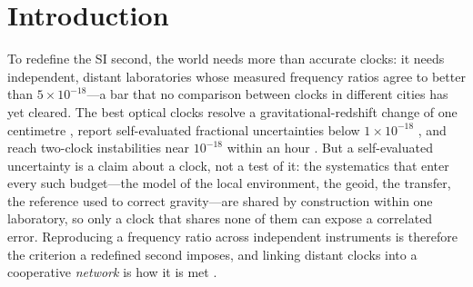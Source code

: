\documentclass[11pt,a4paper]{article}
\begin{document}
\begin{abstract}
\end{abstract}


\section{Introduction}
To redefine the SI second, the world needs more than accurate clocks: it
needs independent, distant laboratories whose measured frequency ratios
agree to better than $5\times10^{-18}$---a bar that no comparison between
clocks in different cities has yet cleared. The best optical clocks
resolve a gravitational-redshift change of one centimetre
\citep{mcgrew2018geodesy}, report self-evaluated fractional uncertainties
below $1\times10^{-18}$ \citep{arnold2026lu, zhang2026ca}, and reach
two-clock instabilities near $10^{-18}$ within an hour
\citep{oelker2019stability}. But a self-evaluated uncertainty is a claim
about a clock, not a test of it: the systematics that enter every such
budget---the model of the local environment, the geoid, the transfer,
the reference used to correct gravity---are shared by construction within
one laboratory, so only a clock that shares none of them can expose a
correlated error. Reproducing a frequency ratio across independent
instruments is therefore the criterion a redefined second imposes, and
linking distant clocks into a cooperative \emph{network}
\citep{riehle2017networks, komar2014quantumnetwork} is how it is met
\citep{dimarcq2024roadmap}.
\end{document}
